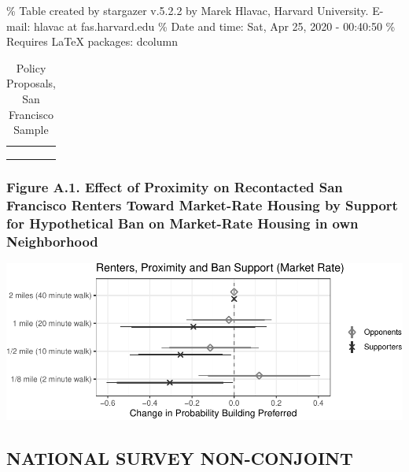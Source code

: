 \documentclass[]{article}
\begin{document}
\% Table created by stargazer v.5.2.2 by Marek Hlavac, Harvard University. E-mail: hlavac at fas.harvard.edu
\% Date and time: Sat, Apr 25, 2020 - 00:40:50
\% Requires LaTeX packages: dcolumn

\begin{table}[H] \centering 
  \caption{Policy Proposals, San Francisco Sample} 
  \label{sf_policies} 
\small 
\begin{tabular}{@{\extracolsep{5pt}} D{.}{.}{-2} } 
\\[-1.8ex]\hline 
\hline \\[-1.8ex] 
 \\ 
\hline \\[-1.8ex] 
\end{tabular} 
\end{table}

\hypertarget{figure-a.1.-effect-of-proximity-on-recontacted-san-francisco-renters-toward-market-rate-housing-by-support-for-hypothetical-ban-on-market-rate-housing-in-own-neighborhood}{%
\subsubsection{Figure A.1. Effect of Proximity on Recontacted San Francisco Renters Toward Market-Rate Housing by Support for Hypothetical Ban on Market-Rate Housing in own Neighborhood}\label{figure-a.1.-effect-of-proximity-on-recontacted-san-francisco-renters-toward-market-rate-housing-by-support-for-hypothetical-ban-on-market-rate-housing-in-own-neighborhood}}

\includegraphics{Zheng-Ruth-Renters-Paper_files/figure-latex/Figure A.1 print-1.pdf}

\hypertarget{national-survey-non-conjoint}{%
\subsection{NATIONAL SURVEY NON-CONJOINT}\label{national-survey-non-conjoint}}
\end{document}
